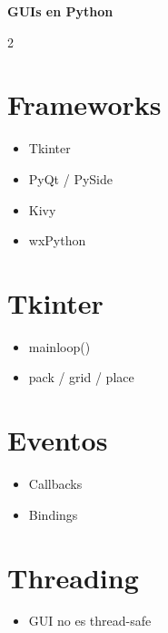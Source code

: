 \documentclass[a4paper,10pt]{article}
\begin{document}
\begin{center}
{\Large \textbf{GUIs en Python}}
\end{center}

\begin{multicols}{2}

\section*{Frameworks}
\begin{itemize}
\item Tkinter
\item PyQt / PySide
\item Kivy
\item wxPython
\end{itemize}

\section*{Tkinter}
\begin{itemize}
\item mainloop()
\item pack / grid / place
\end{itemize}

\section*{Eventos}
\begin{itemize}
\item Callbacks
\item Bindings
\end{itemize}

\section*{Threading}
\begin{itemize}
\item GUI no es thread-safe
\end{itemize}

\end{multicols}
\end{document}
